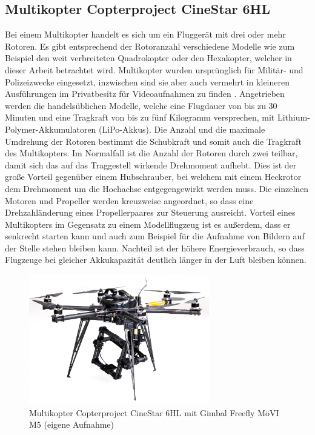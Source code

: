 \documentclass[a4paper,12pt,bibliography=totoc, listof=totoc,titlepage,pointlessnumbers]{scrreprt}
\begin{document}
\subsection{Multikopter Copterproject CineStar 6HL}
Bei einem Multikopter handelt es sich um ein Fluggerät mit drei oder mehr Rotoren. Es gibt entsprechend der Rotoranzahl verschiedene Modelle wie zum Beispiel den weit verbreiteten Quadrokopter oder den Hexakopter, welcher in dieser Arbeit betrachtet wird. Multikopter wurden ursprünglich für Militär- und Polizeizwecke eingesetzt, inzwischen sind sie aber auch vermehrt in kleineren Ausführungen im Privatbesitz für Videoaufnahmen zu finden \citep{Quadro}. Angetrieben werden die handelsüblichen Modelle, welche eine Flugdauer von bis zu 30 Minuten und eine Tragkraft von bis zu fünf Kilogramm versprechen, mit Lithium-Polymer-Akkumulatoren (LiPo-Akkus). Die Anzahl und die maximale Umdrehung der Rotoren bestimmt die Schubkraft und somit auch die Tragkraft des Multikopters. Im Normalfall ist die Anzahl der Rotoren durch zwei teilbar, damit sich das auf das Traggestell wirkende Drehmoment aufhebt. Dies ist der große Vorteil gegenüber einem Hubschrauber, bei welchem mit einem Heckrotor dem Drehmoment um die Hochachse entgegengewirkt werden muss. Die einzelnen Motoren und Propeller werden kreuzweise angeordnet, so dass eine Drehzahländerung eines Propellerpaares zur Steuerung ausreicht. Vorteil eines Multikopters im Gegensatz zu einem Modellflugzeug ist es außerdem, dass er senkrecht starten kann und auch zum Beispiel für die Aufnahme von Bildern auf der Stelle stehen bleiben kann. Nachteil ist der höhere Energieverbrauch, so dass Flugzeuge bei gleicher Akkukapazität deutlich länger in der Luft bleiben können. \citep{Bachfeld}

\begin{figure}
 \centering
 \includegraphics[width=0.7\textwidth]{./img/uav.jpg}
 \caption{Multikopter Copterproject CineStar 6HL mit Gimbal Freefly MöVI M5 (eigene Aufnahme)}
 \label{img:uav}
\end{figure}
\end{document}
